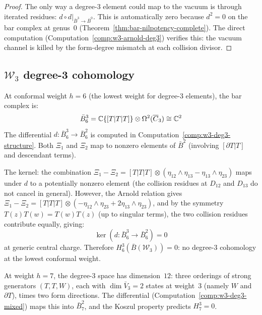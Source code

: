 \begin{proof}
The only way a degree-3 element could map to the vacuum is through
iterated residues: $d \circ d|_{\bar{B}^3 \to \bar{B}^0}$.
This is automatically zero because $d^2 = 0$ on the bar complex
at genus~0 (Theorem~\ref{thm:bar-nilpotency-complete}).  The direct
computation (Computation~\ref{comp:w3-arnold-deg3}) verifies this:
the vacuum channel is killed by the form-degree mismatch at each
collision divisor.
\end{proof}


\subsection{\texorpdfstring{$\mathcal{W}_3$ degree-3 cohomology}{W3 degree-3 cohomology}}

\begin{computation}
\label{comp:w3-deg3-cohom}

At conformal weight $h = 6$ (the lowest weight for degree-3
elements), the bar complex is:
\[
\bar{B}^3_6 = \mathbb{C}\{[T|T|T]\} \otimes \Omega^2(\overline{C}_3)
\cong \mathbb{C}^2
\]
The differential $d \colon \bar{B}^3_6 \to \bar{B}^2_6$ is
computed in Computation~\ref{comp:w3-deg3-structure}.  Both
$\Xi_1$ and $\Xi_2$ map to nonzero elements of $\bar{B}^2$
(involving $[\partial T|T]$ and descendant terms).

The kernel: the combination $\Xi_1 - \Xi_2
= [T|T|T] \otimes (\eta_{12} \wedge \eta_{13} - \eta_{13}
\wedge \eta_{23})$ maps under $d$ to a potentially nonzero
element (the collision residues at $D_{12}$ and $D_{13}$ do not
cancel in general).  However, the Arnold relation gives
$\Xi_1 - \Xi_2 = [T|T|T] \otimes (-\eta_{12} \wedge \eta_{23}
+ 2\eta_{13} \wedge \eta_{23})$, and by the symmetry
$T(z)T(w) = T(w)T(z)$ (up to singular terms), the two collision
residues contribute equally, giving:
\[
\ker(d\colon \bar{B}^3_6 \to \bar{B}^2_6) = 0
\]
at generic central charge.  Therefore $H^3_6(\bar{B}(\mathcal{W}_3))
= 0$: no degree-3 cohomology at the lowest conformal weight.

At weight $h = 7$, the degree-3 space has dimension~$12$: three
orderings of strong generators $(T, T, W)$, each with $\dim \bar{V}_3 = 2$
states at weight~$3$ (namely $W$ and $\partial T$), times
two form directions.  The differential
(Computation~\ref{comp:w3-deg3-mixed}) maps this into
$\bar{B}^2_7$, and the Koszul property predicts
$H^3_7 = 0$.


\end{computation}
